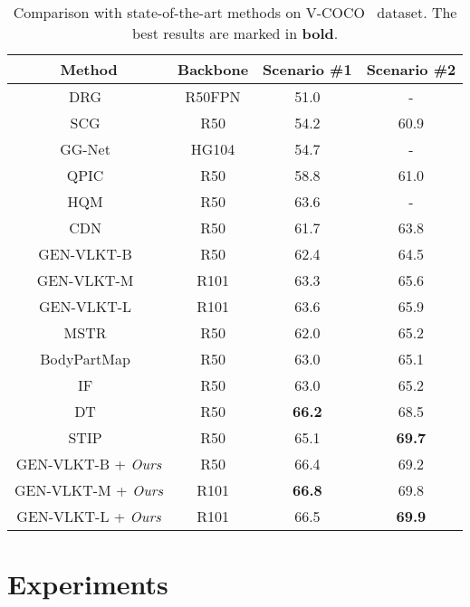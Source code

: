\documentclass[10pt,twocolumn,letterpaper]{article}
\begin{document}
\begin{table}
  \centering
  \begin{adjustbox}{width=\linewidth}
  \begin{tabular}{c c | c c}
    \toprule
    Method & Backbone & Scenario \#1 & Scenario \#2 \\
    \midrule
DRG~\cite{gao2020drg} & R50FPN & 51.0 & - \\
SCG~\cite{zhang2021spatially} & R50 & 54.2 & 60.9 \\
    GG-Net~\cite{zhong2021glance} & HG104 & 54.7 & - \\
QPIC~\cite{tamura2021qpic} & R50 & 58.8 & 61.0 \\
HQM~\cite{zhong2022hardquerymining} & R50 & 63.6 & - \\
    CDN~\cite{zhang2021mining} & R50 & 61.7 & 63.8 \\
GEN-VLKT-B~\cite{liao2022gen} & R50 & 62.4 & 64.5 \\
    GEN-VLKT-M~\cite{liao2022gen} & R101 & 63.3 & 65.6 \\
    GEN-VLKT-L~\cite{liao2022gen} & R101 & 63.6 & 65.9 \\
    MSTR~\cite{kim2022mstr} & R50 & 62.0 & 65.2 \\
    BodyPartMap~\cite{wu2022bodypartmap} & R50 & 63.0 & 65.1 \\
    IF~\cite{liu2022interactiveness} & R50 & 63.0 & 65.2 \\
    DT~\cite{zhou2022disentangled} & R50 & \textbf{66.2} & 68.5 \\
    STIP~\cite{zhang2022STIP} & R50 & 65.1 & \textbf{69.7} \\
    \midrule
GEN-VLKT-B + \textit{Ours} & R50 & 66.4 & 69.2 \\
    GEN-VLKT-M + \textit{Ours} & R101 & \textbf{66.8} & 69.8 \\
    GEN-VLKT-L + \textit{Ours} & R101 & 66.5 & \textbf{69.9} \\
    \bottomrule
  \end{tabular}
  \end{adjustbox}
  \caption{
  Comparison with state-of-the-art methods on V-COCO~\cite{gupta2015visual} dataset.
  The best results are marked in \textbf{bold}.
}
  \vspace{-8pt}
  \label{tab:exp-sota-vcoco}
\end{table}

\section{Experiments}
\end{document}
